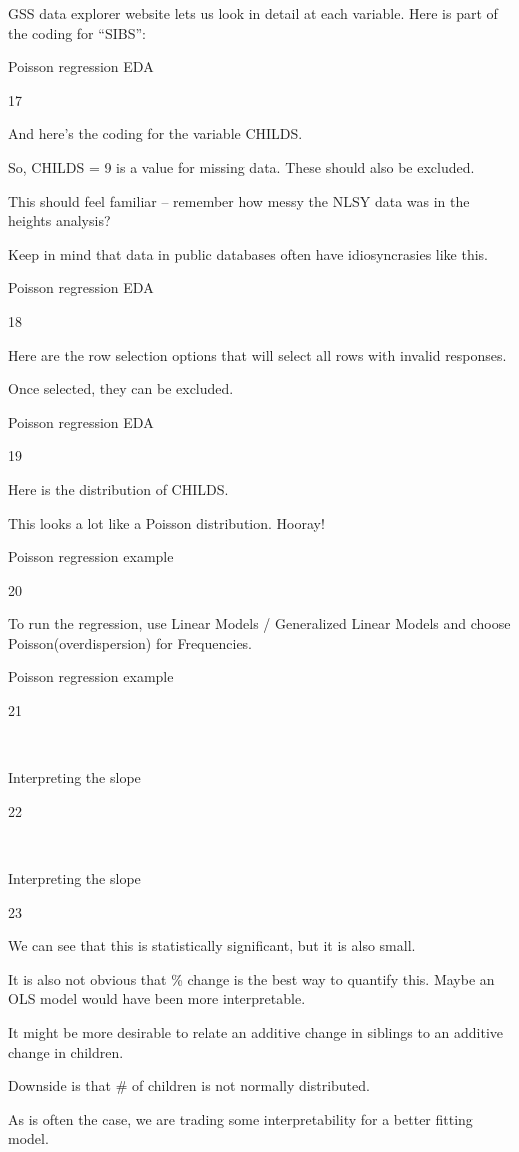 \documentclass[
  letterpaper,
  DIV=11,
  numbers=noendperiod]{scrreprt}
\begin{document}
GSS data explorer website lets us look in detail at each variable. Here
is part of the coding for ``SIBS'':

Poisson regression EDA

17

And here's the coding for the variable CHILDS.

So, CHILDS = 9 is a value for missing data. These should also be
excluded.

This should feel familiar -- remember how messy the NLSY data was in the
heights analysis?

Keep in mind that data in public databases often have idiosyncrasies
like this.

Poisson regression EDA

18

Here are the row selection options that will select all rows with
invalid responses.

Once selected, they can be excluded.

Poisson regression EDA

19

Here is the distribution of CHILDS. 

This looks a lot like a Poisson distribution. Hooray!

Poisson regression example

20

To run the regression, use Linear Models / Generalized Linear Models and
choose Poisson(overdispersion) for Frequencies.

Poisson regression example

21

~

Interpreting the slope

22

~

Interpreting the slope

23

We can see that this is statistically significant, but it is also small.

It is also not obvious that \% change is the best way to quantify this.
Maybe an OLS model would have been more interpretable.

It might be more desirable to relate an additive change in siblings to
an additive change in children.

Downside is that \# of children is not normally distributed.

As is often the case, we are trading some interpretability for a better
fitting model.
\end{document}
